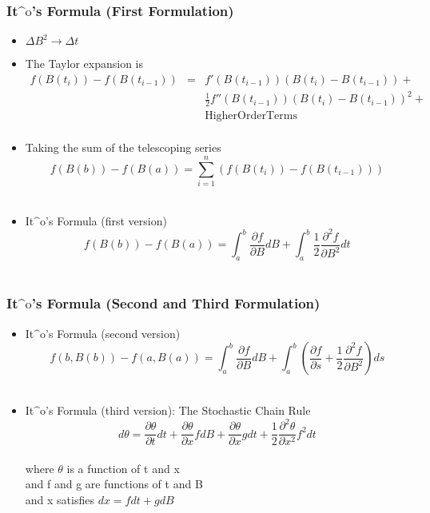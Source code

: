 \begin{frame}
  \frametitle{It$\mathrm{\^o}$'s Formula (First Formulation)}
  \begin{itemize}
  \item $\Delta B^2 \to \Delta t$\\
  \item  The Taylor expansion is
  \begin{eqnarray*}
    f(B(t_i))-f(B(t_{i-1}))&=&f'(B(t_{i-1}))(B(t_i)-B(t_{i-1}))+\\
    & &\frac{1}{2}f''(B(t_{i-1}))(B(t_i)-B(t_{i-1}))^2+\\
    & &\mathrm{Higher Order Terms}\\
  \end{eqnarray*}
  \item Taking the sum of the telescoping series $$f(B(b))-f(B(a))=\sum_{i=1}^{n}(f(B(t_i))-f(B(t_{i-1})))$$\\
  \item It$\mathrm{\^o}$'s Formula (first version) $$f(B(b))-f(B(a))=\int_{a}^{b}{\frac{\partial f}{\partial B} dB}+\int_{a}^{b}{\frac{1}{2} \frac{\partial^2 f}{\partial B^2} dt} $$\\
  \end{itemize}
\end{frame}

\begin{frame}
  \frametitle{It$\mathrm{\^o}$'s Formula (Second and Third Formulation)}
  \begin{itemize}
  \item  It$\mathrm{\^o}$'s Formula (second version) $$f(b,B(b))-f(a,B(a))=\int_{a}^{b}{\frac{\partial f}{\partial B} dB}+\int_{a}^{b}{(\frac{\partial f}{\partial s}+\frac{1}{2}\frac{\partial ^2 f}{\partial B^2}) ds}$$\\
  \item  It$\mathrm{\^o}$'s Formula (third version): The Stochastic Chain Rule $$d\theta=\frac{\partial\theta}{\partial t}dt+\frac{\partial\theta}{\partial x}f dB+\frac{\partial\theta}{\partial x}g dt+\frac{1}{2}\frac{\partial^2\theta}{\partial x^2}f^2dt$$\\
  where $\theta$ is a function of t and x\\
  and f and g are functions of t and B\\
  and x satisfies $dx=fdt+gdB$
  \end{itemize}
  
\end{frame}

